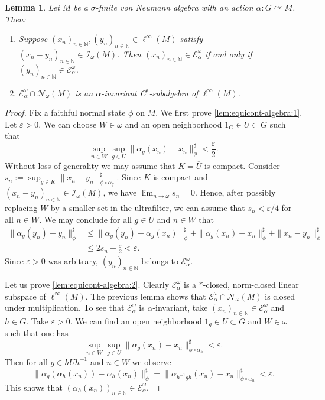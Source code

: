 \documentclass[11pt,a4paper]{article}
\newtheorem{lemma}[theorem]{Lemma}
\theoremstyle{definition}
\theoremstyle{remark}
\numberwithin{equation}{section}
\numberwithin{theorem}{section}
\newcommand{\N}{\mathbb{N}}
\newcommand{\acts}{\curvearrowright}
\newcommand{\e}{\varepsilon}
\begin{document}
\begin{lemma}
Let $M$ be a $\sigma$-finite von Neumann algebra with an action $\alpha: G \acts M$.
Then:
\begin{enumerate}[label=\textup{(\arabic*)},leftmargin=*]
\item \label{lem:equicont-algebra:1}
Suppose $(x_n)_{n\in \N}, (y_n)_{n\in \N} \in \ell^\infty(M)$ satisfy $(x_n-y_n)_{n\in \N} \in \mathcal{I}_\omega(M)$.
Then $(x_n)_{n\in \N} \in \mathcal{E}^\omega_\alpha$ if and only if $(y_n)_{n\in \N} \in \mathcal{E}^\omega_\alpha$.
\item \label{lem:equicont-algebra:2}
$\mathcal{E}_\alpha^\omega \cap \mathcal{N}_\omega(M)$ is an $\alpha$-invariant C$^*$-subalgebra of $\ell^\infty(M)$. 
\end{enumerate}
\end{lemma}
\begin{proof} Fix a faithful normal state $\phi$ on $M$.
We first prove \ref{lem:equicont-algebra:1}.
Let $\e>0$.
We can choose $W \in \omega$ and an open neighborhood $1_G \in U \subset G$ such that 
\[
\sup_{n\in W} \sup_{g\in U} \|\alpha_g(x_n) - x_n\|_\phi^\sharp < \frac{\e}{2}.
\] 
Without loss of generality we may assume that $K=\overline{U}$ is compact.
Consider $s_n := \sup_{g \in K} \|x_n - y_n\|_{\phi \circ \alpha_g}^\sharp$. Since $K$ is compact and ${(x_n-y_n)_{n\in \N} \in \mathcal{I}_\omega(M)}$, we have $\lim_{n \rightarrow \omega} s_n = 0$.
Hence, after possibly replacing $W$ by a smaller set in the ultrafilter, we can assume that $s_n < \e/4$ for all $n \in W$.
We may conclude for all $g \in U$ and $n \in W$ that
\begin{align*}
\|\alpha_g(y_n) - y_n\|_\phi^\sharp &\leq \|\alpha_g(y_n) - \alpha_g(x_n)\|_\phi^\sharp + \|\alpha_g(x_n)- x_n\|_\phi^\sharp + \|x_n - y_n\|_\phi^\sharp\\
&\leq 2s_n + \frac{\e}{2} < \e.
\end{align*}
Since $\e>0$ was arbitrary, $(y_n)_{n\in \N}$ belongs to $\mathcal{E}_\alpha^\omega$.

Let us prove \ref{lem:equicont-algebra:2}.
Clearly $\mathcal{E}_\alpha^\omega$ is a $*$-closed, norm-closed linear subspace of $\ell^\infty(M)$. 
The previous lemma shows that $\mathcal{E}_\alpha^\omega \cap \mathcal{N}_\omega(M)$ is closed under multiplication. 
To see that $\mathcal{E}_\alpha^\omega$ is $\alpha$-invariant, take $(x_n)_{n \in \N} \in \mathcal{E}_\alpha^\omega$ and $h \in G$. Take $\e >0$. 
We can find an open neighborhood $1_g \in U \subset G$ and $W \in \omega$ such that one has
\[\sup_{n \in W}\sup_{g \in U}\|\alpha_g(x_n) - x_n\|_{\phi \circ \alpha_h}^\sharp < \e.\] 
Then for all $g \in hUh^{-1}$ and $n \in W$ we observe
\[
\|\alpha_g(\alpha_h(x_n)) - \alpha_h(x_n)\|_\phi^\sharp = \|\alpha_{h^{-1}gh}(x_n) - x_n\|_{\phi \circ \alpha_h}^\sharp < \e.
\]
This shows that $(\alpha_h(x_n))_{n\in \N} \in \mathcal{E}_\alpha^\omega$.
\end{proof}
\end{document}
